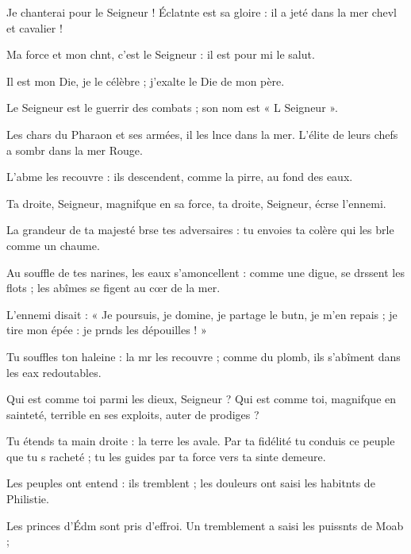 \item Je chanterai pour le Seigneur ! Éclatnte est sa gloire :\psstar{} il a jeté dans la mer chevl et cavalier !
\item Ma force et mon chnt, c’est le Seigneur :\psstar{} il est pour mi le salut.
\item Il est mon Die, je le célèbre ;\psstar{} j’exalte le Die de mon père. 
\item Le Seigneur est le guerrir des combats ;\psstar{} son nom est « L Seigneur ». 
\item Les chars du Pharaon et ses armées,\pscross{} il les lnce dans la mer.\psstar{} L’élite de leurs chefs a sombr dans la mer Rouge.
\item L’abme les recouvre :\psstar{} ils descendent, comme la pirre, au fond des eaux.
\item Ta droite, Seigneur, magnifque en sa force,\psstar{} ta droite, Seigneur, écrse l’ennemi.
\item La grandeur de ta majesté brse tes adversaires :\psstar{} tu envoies ta colère qui les brle comme un chaume.
\item Au souffle de tes narines, les eaux s’amoncellent :\pscross{} comme une digue, se drssent les flots ;\psstar{} les abîmes se figent au cœr de la mer. 
\item L’ennemi disait : « Je poursuis, je domine,\pscross{} je partage le butn, je m’en repais ;\psstar{} je tire mon épée : je prnds les dépouilles ! » 
\item Tu souffles ton haleine : la mr les recouvre ;\psstar{} comme du plomb, ils s’abîment dans les eax redoutables.
\item Qui est comme toi parmi les dieux, Seigneur ?\pscross{} Qui est comme toi, magnifque en sainteté,\psstar{} terrible en ses exploits, auter de prodiges ? 
\item Tu étends ta main droite : la terre les avale.\pscross{} Par ta fidélité tu conduis ce peuple que tu s racheté ;\psstar{} tu les guides par ta force vers ta sinte demeure.
\item Les peuples ont entend : ils tremblent ;\psstar{} les douleurs ont saisi les habitnts de Philistie.
\item Les princes d’Édm sont pris d’effroi.\psstar{} Un tremblement a saisi les puissnts de Moab ; 
